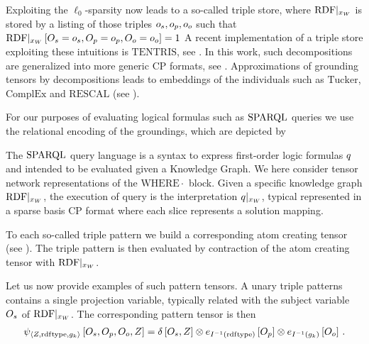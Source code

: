 Exploiting the $\ell_0$-sparsity now leads to a so-called triple store, where ${\mathrm{RDF}}|_{x_{W}}$ is stored by a listing of those triples $o_{s},o_{p},o_{o}$ such that ${\mathrm{RDF}}|_{x_{W}}\left[O_{s}=o_{s}, O_{p}=o_{p}, O_{o}=o_{o}\right]=1$
A recent implementation of a triple store exploiting these intuitions is $\mathrm{TENTRIS}$, see \cite{pan_tentris_2020}.
In this work, such decompositions are generalized into more generic CP formats, see .
Approximations of grounding tensors by decompositions leads to embeddings of the individuals such as $\mathrm{Tucker}$, $\mathrm{ComplEx}$ and $\mathrm{RESCAL}$ (see \cite{nickel_review_2016}).



For our purposes of evaluating logical formulas such as $\mathrm{SPARQL}$ queries we use the relational encoding of the groundings, which are depicted by
\begin{center}
    
\end{center}





The $\mathrm{SPARQL}$ query language is a syntax to express first-order logic formulas $q$ and intended to be evaluated given a Knowledge Graph.
We here consider tensor network representations of the $\mathrm{WHERE}{\cdot}$ block.
Given a specific knowledge graph ${\mathrm{RDF}}|_{x_{W}}$, the execution of query is the interpretation ${q}|_{x_{W}}$, typical represented in a sparse basis CP format where each slice represents a solution mapping.


To each so-called triple pattern we build a corresponding atom creating tensor (see ).
The triple pattern is then evaluated by contraction of the atom creating tensor with ${\mathrm{RDF}}|_{x_{W}}$.

Let us now provide examples of such pattern tensors.
A unary triple patterns contains a single projection variable, typically related with the subject variable $O_{s}$ of ${\mathrm{RDF}}|_{x_{W}}$.
The corresponding pattern tensor is then
\begin{align*}
    \psi_{\braket{Z,\mathrm{rdf}\mathrm{type},g_{k}}}\left[
        O_{s}, O_{p}, O_{o}, Z
    \right]
    = \delta\left[O_{s},Z\right]
    \otimes e_{I^{-1}(\mathrm{rdf}\mathrm{type})}\left[O_{p}\right]
    \otimes e_{I^{-1}(g_{k})}\left[O_{o}\right] \, .
\end{align*}

